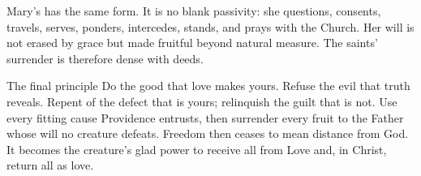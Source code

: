 Mary's  has the same form. It is no blank passivity: she questions, consents, travels, serves, ponders, intercedes, stands, and prays with the Church. Her will is not erased by grace but made fruitful beyond natural measure. The saints' surrender is therefore dense with deeds.

\begin{studybox}{The final principle}
Do the good that love makes yours. Refuse the evil that truth reveals. Repent
of the defect that is yours; relinquish the guilt that is not. Use every fitting
cause Providence entrusts, then surrender every fruit to the Father whose will
no creature defeats. Freedom then ceases to mean distance from God. It becomes
the creature's glad power to receive all from Love and, in Christ, return all
as love.
\end{studybox}
